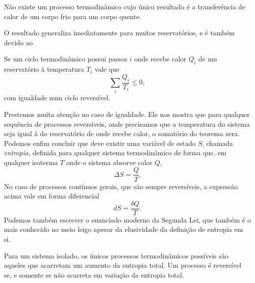 \setcounter{law}{1}
\begin{law}[Clausius]
    Não existe um processo termodinâmico cujo único resultado é a transferência
    de calor de um corpo frio para um corpo quente.
\end{law}

O resultado generaliza imediatamente para muitos reservatórios, e é também
devido ao
\begin{theorem}[Clausius]
    Se um ciclo termodinâmico possui passos $i$ onde recebe calor $Q_i$ de um
    reservatório à temperatura $T_i$ vale que
    $$\sum_i\frac{Q_i}{T_i}\leq0,$$
    com igualdade num ciclo reversível.
\end{theorem}

Prestemos muita atenção no caso de igualdade. Ele nos mostra que para qualquer
sequência de processos reversíveis, onde precisamos que a temperatura do sistema
seja igual à do reservatório de onde recebe calor, o somatório do teorema zera.
Podemos enfim concluir que deve existir uma variável de estado $S$, chamada
\emph{entropia}, definida para qualquer sistema termodinâmico de forma que, em
qualquer isoterma $T$ onde o sistema absorve calor $Q$,
$$\Delta S=\frac{Q}{T}.$$
No caso de processos contínuos gerais, que são sempre reversíveis, a expressão
acima vale em forma diferencial
$$dS=\frac{\delta Q}{T}.$$
Podemos também escrever o enunciado moderno da Segunda Lei, que também é o mais
conhecido no meio leigo apesar da elusividade da definição de entropia em si.
\setcounter{law}{1}
\begin{law}[Entropia]
    Para um sistema isolado, os únicos processos termodinâmicos possíveis são
    aqueles que acarretam um aumento da entropia total. Um processo é reversível
    se, e somente se não acarreta em variação da entropia total.
\end{law}

